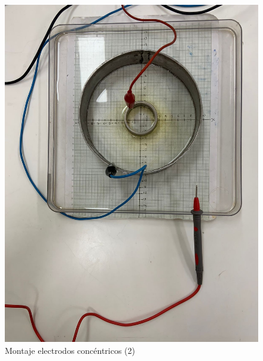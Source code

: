 \documentclass[letterpaper, 12pt]{report}
\begin{document}
\begin{figure}[H]
	\begin{center}
		\includegraphics[scale = 0.3]{./Images/2.jpeg}
		\caption{Montaje electrodos concéntricos (2)}
	\end{center}
\end{figure}
\end{document}

